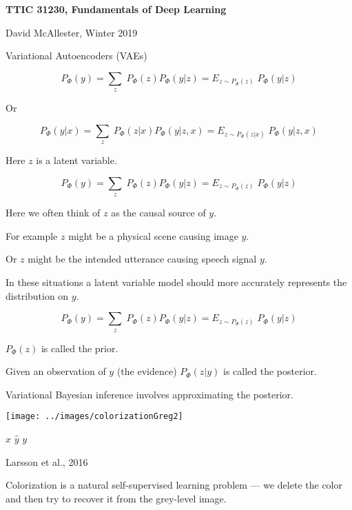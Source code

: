 





{\Huge

  \centerline{\bf TTIC 31230, Fundamentals of Deep Learning}
  \bigskip
  \centerline{David McAllester, Winter 2019}
  \vfill
  \vfil
  \centerline{Variational Autoencoders (VAEs)}
  \vfill
  \vfill


{\color{red} $$P_\Phi(y) = \sum_z\;P_\Phi(z)P_\Phi(y|z) = E_{z \sim P_\Phi(z)}\;P_\Phi(y|z)$$}

Or

\vfill
{\color{red} $$P_\Phi(y|x) = \sum_z\;P_\Phi(z|x)P_\Phi(y|z,x) = E_{z \sim P_\Phi(z|x)}\;P_\Phi(y|z,x)$$}

\vfill
Here {\color{red} $z$} is a latent variable.


{\color{red} $$P_\Phi(y) = \sum_z\;P_\Phi(z)P_\Phi(y|z) = E_{z \sim P_\Phi(z)}\;P_\Phi(y|z)$$}

Here we often think of $z$ as the causal source of $y$.

\vfill
For example $z$ might be a physical scene causing image $y$.

\vfill
Or $z$ might be the intended utterance causing speech signal $y$.

\vfill
In these situations a latent variable model should more accurately represents the distribution on $y$.


{\color{red} $$P_\Phi(y) = \sum_z\;P_\Phi(z)P_\Phi(y|z) = E_{z \sim P_\Phi(z)}\;P_\Phi(y|z)$$}

\vfill
$P_\Phi(z)$ is called the prior.

\vfill
Given an observation of $y$ (the evidence) $P_\Phi(z|y)$ is called the posterior.

\vfill
Variational Bayesian inference involves approximating the posterior.

\medskip
\centerline{\texttt{[image: ../images/colorizationGreg2]}}
\centerline{$x$ \hspace{4em} $\hat{y}$ \hspace{4em} $y$}
\centerline{\huge Larsson et al., 2016}

\vfill
Colorization is a natural self-supervised learning problem --- we delete the color and then try to recover it from the grey-level image.

}
